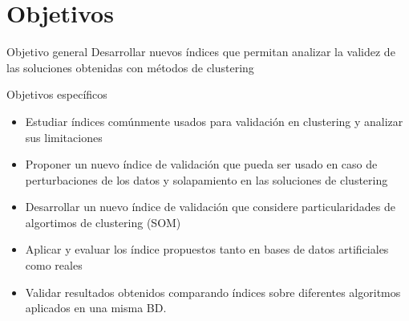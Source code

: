 \section{Objetivos}

\begin{frame}[t]
	\vspace{-4mm}
    \begin{block}{{\large Objetivo general}} 
	    {Desarrollar nuevos índices que permitan analizar la validez de las soluciones obtenidas con métodos de clustering}
    \end{block}
\vspace{-2.5mm}
\pause
    \begin{block}{Objetivos específicos}
    	\begin{itemize}
    		\item<2-> Estudiar índices comúnmente usados para validación en clustering y analizar sus limitaciones
	   		\item<3-> Proponer un nuevo índice de validación que pueda ser usado en caso de perturbaciones de los datos y solapamiento en las soluciones de clustering
    		\item<4-> Desarrollar un nuevo índice de validación que considere particularidades de algortimos de clustering (SOM)
    		\item<5-> Aplicar y evaluar los índice propuestos tanto en bases de datos artificiales como reales
    		\item<6-> Validar resultados obtenidos comparando índices sobre diferentes algoritmos aplicados en una misma BD.
    	\end{itemize}
    \end{block}
\end{frame}
